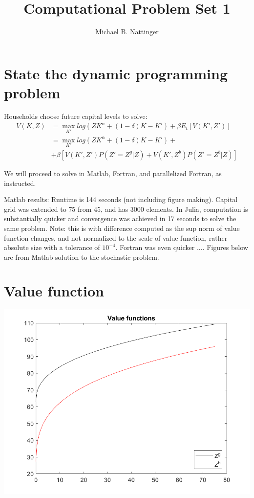 \documentclass[11pt]{article} %
\title{Computational Problem Set 1}
\author{Michael B. Nattinger}
\begin{document}
\maketitle

\section{State the dynamic programming problem}
Households choose future capital levels to solve:
\begin{align*}
V(K,Z) &= \max_{K'} log(ZK^{\alpha} + (1-\delta)K - K') + \beta E_t[V(K',Z')]\\
&=  \max_{K'} log(ZK^{\alpha} + (1-\delta)K - K') + \\ &+ \beta[V(K',Z')P(Z' = Z^g|Z) + V(K',Z^b)P(Z' = Z^b|Z)]
\end{align*}

We will proceed to solve in Matlab, Fortran, and parallelized Fortran, as instructed.

Matlab results: Runtime is 144 seconds (not including figure making). Capital grid was extended to 75 from 45, and has 3000 elements. In Julia, computation is substantially quicker and convergence was achieved in 17 seconds to solve the same problem. Note: this is with difference computed as the sup norm of value function changes, and not normalized to the scale of value function, rather absolute size with a tolerance of $10^{-4}$. Fortran was even quicker .... Figures below are from Matlab solution to the stochastic problem.

\section{Value function}
\includegraphics{value}
\end{document}
